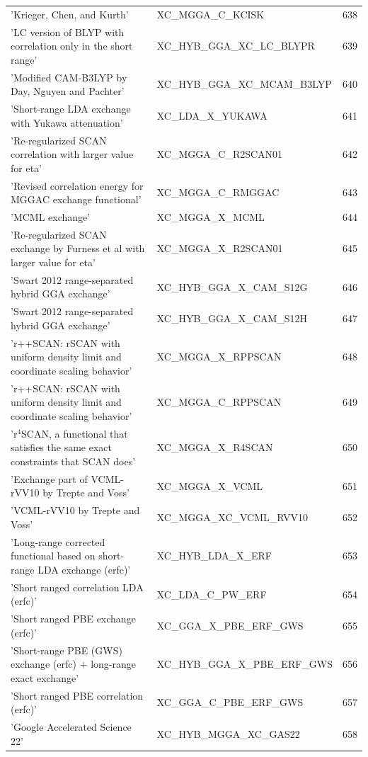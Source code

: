 \documentclass[final,12pt]{article}
\begin{document}
{{{{{{\begin{table}[!h]
\begin{center}
\begin{tabular}{llr}
  'Krieger, Chen, and Kurth' & XC\_MGGA\_C\_KCISK  &638\\
  'LC version of BLYP with correlation only in the short range' & XC\_HYB\_GGA\_XC\_LC\_BLYPR  &639\\
  'Modified CAM-B3LYP by Day, Nguyen and Pachter' & XC\_HYB\_GGA\_XC\_MCAM\_B3LYP  &640\\
  'Short-range LDA exchange with Yukawa attenuation' & XC\_LDA\_X\_YUKAWA  &641\\
  'Re-regularized SCAN correlation with larger value for eta' & XC\_MGGA\_C\_R2SCAN01  &642\\
  'Revised correlation energy for MGGAC exchange functional' & XC\_MGGA\_C\_RMGGAC  &643\\
  'MCML exchange' & XC\_MGGA\_X\_MCML  &644\\
  'Re-regularized SCAN exchange by Furness et al with larger value for eta' & XC\_MGGA\_X\_R2SCAN01  &645\\
  'Swart 2012 range-separated hybrid GGA exchange' & XC\_HYB\_GGA\_X\_CAM\_S12G  &646\\
  'Swart 2012 range-separated hybrid GGA exchange' & XC\_HYB\_GGA\_X\_CAM\_S12H  &647\\
  'r++SCAN: rSCAN with uniform density limit and coordinate scaling behavior' & XC\_MGGA\_X\_RPPSCAN  &648\\
  'r++SCAN: rSCAN with uniform density limit and coordinate scaling behavior' & XC\_MGGA\_C\_RPPSCAN  &649\\
  'r$^{4}$SCAN, a functional that satisfies the same exact constraints that SCAN does' & XC\_MGGA\_X\_R4SCAN  &650\\
  'Exchange part of VCML-rVV10 by Trepte and Voss' & XC\_MGGA\_X\_VCML  &651\\
  'VCML-rVV10 by Trepte and Voss' & XC\_MGGA\_XC\_VCML\_RVV10  &652\\
  'Long-range corrected functional based on short-range LDA exchange (erfc)' & XC\_HYB\_LDA\_X\_ERF  &653\\
  'Short ranged correlation LDA (erfc)' & XC\_LDA\_C\_PW\_ERF  &654\\
  'Short ranged PBE exchange (erfc)' & XC\_GGA\_X\_PBE\_ERF\_GWS  &655\\
  'Short-range PBE (GWS) exchange (erfc) + long-range exact exchange' & XC\_HYB\_GGA\_X\_PBE\_ERF\_GWS  &656\\
  'Short ranged PBE correlation (erfc)' & XC\_GGA\_C\_PBE\_ERF\_GWS  &657\\
  'Google Accelerated Science 22' & XC\_HYB\_MGGA\_XC\_GAS22  &658\\

\end{tabular}
\end{center}
\end{table}}}}}}}
\end{document}
